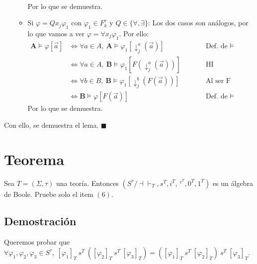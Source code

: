 \documentclass{article}
\begin{document}
\begin{itemize}
\begin{itemize}
\begin{equation*}
\begin{alignedat}{2}
                  \end{alignedat}
                \end{equation*}
                Por lo que se demuestra.
          \item Si $\varphi=Qx_j\varphi_1$ con $\varphi_1\in F^\tau_k$ y $Q\in\{\forall,\exists\}$: Los dos casos son análogos, por lo que vamos a ver $\varphi=\forall x_j\varphi_1$. Por ello:
                \begin{equation*}
                  \begin{alignedat}{2}
                    \mathbf{A}\vDash\varphi[\vec{a}] & \iff\forall a\in A,\ \mathbf{A}\vDash\varphi_1[\downarrow^a_j(\vec{a})]    &  & \qquad\text{Def. de }\vDash                         \\
                                                     & \iff\forall a\in A,\ \mathbf{B}\vDash\varphi_1[F(\downarrow^a_j(\vec{a}))] &  & \qquad\text{HI}                                     \\
                                                     & \iff\forall b\in B,\ \mathbf{B}\vDash\varphi_1[\downarrow^b_j(F(\vec{a}))] &  & \qquad\text{Al ser F isomorfismo (i.e., biyectivo)} \\
                                                     & \iff\mathbf{B}\vDash\varphi[F(\vec{a})]                                    &  & \qquad\text{Def. de }\vDash
                  \end{alignedat}
                \end{equation*}
                Por lo que se demuestra.
        \end{itemize}
\end{itemize}

Con ello, se demuestra el lema. $\blacksquare$

\section*{Teorema}
Sea $T=(\Sigma,\tau)$ una teoría. Entonces $(S^\tau/\dashv\vdash_T,s^T,i^T,\ ^{c^T},0^T,1^T)$ es un álgebra de Boole.
\newline
Pruebe solo el item $(6)$.
\subsection*{Demostración}
Queremos probar que $\forall\varphi_1,\varphi_2,\varphi_3\in S^\tau,\ [\varphi_1]_T\ s^T\ ([\varphi_2]_T\ s^T\ [\varphi_3]_T)=([\varphi_1]_T\ s^T\ [\varphi_2]_T)\ s^T\ [\varphi_3]_T$.
\end{document}
